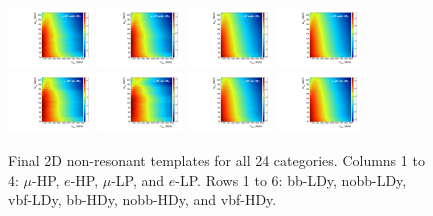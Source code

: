 \begin{figure}[htbp]
  \includegraphics[width=0.2\textwidth]{fig/analysis/template_nonRes_mu_HP_nobb_HDy.pdf}
  \includegraphics[width=0.2\textwidth]{fig/analysis/template_nonRes_e_HP_nobb_HDy.pdf}
  \includegraphics[width=0.2\textwidth]{fig/analysis/template_nonRes_mu_LP_nobb_HDy.pdf}
  \includegraphics[width=0.2\textwidth]{fig/analysis/template_nonRes_e_LP_nobb_HDy.pdf}\\
  \includegraphics[width=0.2\textwidth]{fig/analysis/template_nonRes_mu_HP_vbf_HDy.pdf}
  \includegraphics[width=0.2\textwidth]{fig/analysis/template_nonRes_e_HP_vbf_HDy.pdf}
  \includegraphics[width=0.2\textwidth]{fig/analysis/template_nonRes_mu_LP_vbf_HDy.pdf}
  \includegraphics[width=0.2\textwidth]{fig/analysis/template_nonRes_e_LP_vbf_HDy.pdf}\\
  \caption{
    Final 2D non-resonant templates for all 24 categories.
    Columns 1 to 4: $\mu$-HP, $e$-HP, $\mu$-LP, and $e$-LP.
    Rows 1 to 6: bb-LDy, nobb-LDy, vbf-LDy, bb-HDy, nobb-HDy, and vbf-HDy.
  }
  \label{fig:templates_nonRes_Run2}
\end{figure}

